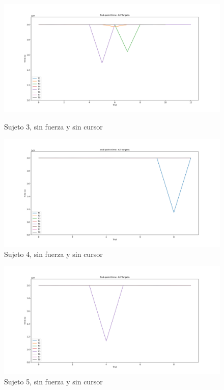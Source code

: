 \documentclass[a4paper,11pt, oneside]{book}
\begin{document}
\begin{figure}[H]
	\begin{minipage}[b]{0.5\linewidth}
		\centering
		\includegraphics[width=\linewidth]{sujeto3/no_force_no_cursor/evolution_time}
		\caption{Sujeto 3, sin fuerza y sin cursor}
		\label{fig:figura1}
	\end{minipage}
	\hspace{0.5cm}
	\begin{minipage}[b]{0.5\linewidth}
		\centering
		\includegraphics[width=\linewidth]{sujeto4/no_force_no_cursor/evolution_time}
		\caption{Sujeto 4, sin fuerza y sin cursor}
		\label{fig:figura2}
	\end{minipage}
\end{figure}
\begin{figure}[H]
	\begin{minipage}[b]{0.5\linewidth}
		\centering
		\includegraphics[width=\linewidth]{sujeto5/no_force_no_cursor/evolution_time}
		\caption{Sujeto 5, sin fuerza y sin cursor}
		\label{fig:figura1}
	\end{minipage}
\end{figure}
\end{document}
